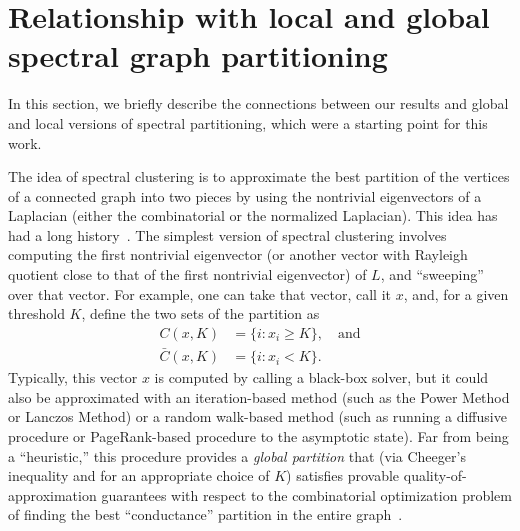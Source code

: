 
\section{Relationship with local and global spectral graph partitioning}
\label{sxn:local-partitioning}
\vspace{-2mm}

In this section, we briefly describe the connections between our results 
and global and local versions of spectral partitioning, which were a 
starting point for this work.

The idea of spectral clustering is to approximate the best partition of the 
vertices of a connected graph into two pieces by using the nontrivial 
eigenvectors of a Laplacian (either the combinatorial or the normalized
Laplacian).  
This idea has had a long history~\cite{Donath:1973,fiedler75B,spielman96_spectral,guatterymiller98,ShiMalik00_NCut}.
The simplest version of spectral clustering involves computing the first 
nontrivial eigenvector (or another vector with Rayleigh quotient close to 
that of the first nontrivial eigenvector) of $L$, and ``sweeping'' over 
that vector. 
For example, 
one can take that vector, call it $x$, and, for a given threshold $K$, 
define the two sets of the partition as
\vspace{-2mm}
\begin{align*}
  C(x,K)      &= \{ i : x_i \ge K \}, \quad \text{and} \\
  \bar C(x,K) &= \{ i : x_i < K \}.
\end{align*}
Typically, this vector $x$ is computed by calling a black-box solver, but it 
could also be approximated with an iteration-based method (such as the Power
Method or Lanczos Method) or a random walk-based method (such as running a 
diffusive procedure or PageRank-based procedure to the asymptotic state).
Far from being a ``heuristic,'' 
this procedure provides a \emph{global 
partition} that (via Cheeger's inequality and for an appropriate choice of 
$K$) satisfies provable quality-of-approximation guarantees with respect to 
the combinatorial optimization problem of finding the best ``conductance'' 
partition in the entire 
graph~\cite{Mihail,spielman96_spectral,guatterymiller98}.

